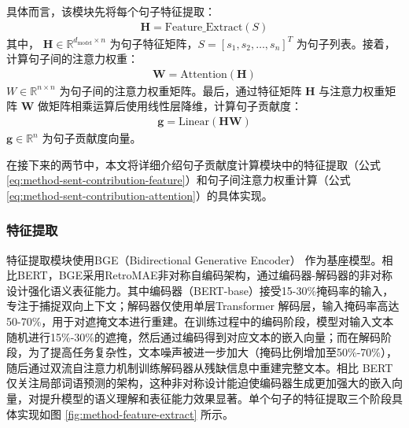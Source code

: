 具体而言，该模块先将每个句子特征提取：
\begin{equation}
\begin{aligned}
    \textbf{H} = \text{Feature\_Extract}(S)
\end{aligned}
\label{eq:method-sent-contribution-feature}
\end{equation}
其中， \(\textbf{H} \in \mathbb{R}^{d_\text{model} \times n}\) 为句子特征矩阵，\(S = [s_1, s_2, \ldots, s_n]^T\) 为句子列表。接着，计算句子间的注意力权重：
\begin{equation}
\begin{aligned}
    \textbf{W} = \text{Attention}(\textbf{H})
\end{aligned}
\label{eq:method-sent-contribution-attention}
\end{equation}
\(W \in \mathbb{R}^{n \times n}\) 为句子间的注意力权重矩阵。最后，通过特征矩阵 $\textbf{H}$ 与注意力权重矩阵 $\textbf{W}$ 做矩阵相乘运算后使用线性层降维，计算句子贡献度：
\begin{equation}
\begin{aligned}
    \textbf{g} = \text{Linear}(\textbf{HW})
\end{aligned}
\label{eq:method-sent-contribution}
\end{equation}
\(\textbf{g} \in \mathbb{R}^{n}\) 为句子贡献度向量。

在接下来的两节中，本文将详细介绍句子贡献度计算模块中的特征提取（公式 \ref{eq:method-sent-contribution-feature}）和句子间注意力权重计算（公式 \ref{eq:method-sent-contribution-attention}）的具体实现。

\subsubsection{特征提取}
\label{sec:method-sent2arti-featureextract}

特征提取模块使用BGE（Bidirectional Generative Encoder）\cite{bge_embedding} 作为基座模型。相比BERT，BGE采用RetroMAE非对称自编码架构，通过编码器-解码器的非对称设计强化语义表征能力。其中编码器（BERT-base）接受15-30\%掩码率的输入，专注于捕捉双向上下文；解码器仅使用单层Transformer 解码层，输入掩码率高达50-70\%，用于对遮掩文本进行重建。在训练过程中的编码阶段，模型对输入文本随机进行15\%-30\%的遮掩，然后通过编码得到对应文本的嵌入向量；而在解码阶段，为了提高任务复杂性，文本噪声被进一步加大（掩码比例增加至50\%-70\%），随后通过双流自注意力机制训练解码器从残缺信息中重建完整文本。相比 BERT 仅关注局部词语预测的架构，这种非对称设计能迫使编码器生成更加强大的嵌入向量，对提升模型的语义理解和表征能力效果显著。单个句子的特征提取三个阶段具体实现如图 \ref{fig:method-feature-extract} 所示。

